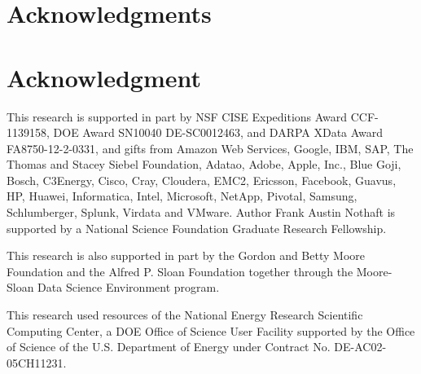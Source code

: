 \documentclass[10pt,journal,compsoc]{IEEEtran}
\begin{document}



\ifCLASSOPTIONcompsoc
  \section*{Acknowledgments}
\else
  \section*{Acknowledgment}
\fi

This research is supported in part by NSF CISE Expeditions Award CCF-1139158, DOE Award SN10040 DE-SC0012463, and DARPA XData Award FA8750-12-2-0331, and gifts from Amazon Web Services, Google, IBM, SAP, The Thomas and Stacey Siebel Foundation, Adatao, Adobe, Apple, Inc., Blue Goji, Bosch, C3Energy, Cisco, Cray, Cloudera, EMC2, Ericsson, Facebook, Guavus, HP, Huawei, Informatica, Intel, Microsoft, NetApp, Pivotal, Samsung, Schlumberger, Splunk, Virdata and VMware. Author Frank Austin Nothaft is supported by a National Science Foundation Graduate Research Fellowship.

This research is also supported in part by the Gordon and Betty Moore
Foundation and the Alfred P. Sloan Foundation together through the
Moore-Sloan Data Science Environment program.

This research used resources of the National Energy Research Scientific Computing Center, a DOE Office of Science User Facility supported by the Office of Science of the U.S. Department of Energy under Contract No. DE-AC02-05CH11231.

\ifCLASSOPTIONcaptionsoff
  \newpage
\fi



\end{document}
